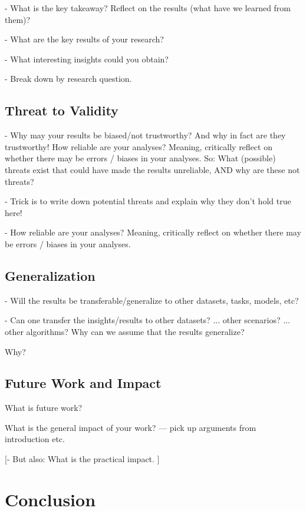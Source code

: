 \documentclass[sigconf, review, nonacm]{acmart}
\begin{document}
- What is the key takeaway? Reflect on the results (what have we learned from them)?

- What are the key results of your research?

- What interesting insights could you obtain?

- Break down by research question.

\subsection{Threat to Validity}
\label{sec:threattovalidity}

- Why may your results be biased/not trustworthy? And why in fact are they trustworthy! How reliable are your analyses? Meaning, critically reflect on whether there may be errors / biases in your analyses. So: What (possible) threats exist that could have made the results unreliable, AND why are these not threats?

- Trick is to write down potential threats and explain why they don't hold true here!

- How reliable are your analyses? Meaning, critically reflect on whether there may be errors / biases in your analyses.

\subsection{Generalization}
\label{sec:generalization}

- Will the results be transferable/generalize to other datasets, tasks, models, etc?

- Can one transfer the insights/results to other datasets? ... other scenarios? ... other algorithms? Why can we assume that the results generalize?

Why?

\subsection{Future Work and Impact}
\label{sec:futurework}

What is future work?

What is the general impact of your work?
--- pick up arguments from introduction etc.

[- But also: What is the practical impact. ]



\section{Conclusion}
\label{sec:conclusion}
\end{document}
